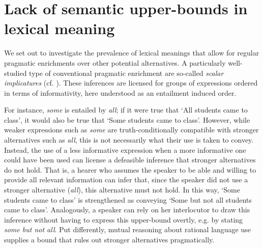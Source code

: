 \documentclass[a4paper]{article}
\newcommand{\tuple}[1]{\ensuremath{\left\langle #1 \right\rangle}}
\begin{document}



\section{Lack of semantic upper-bounds in lexical meaning}
We set out to investigate the prevalence of lexical meanings that allow for regular pragmatic enrichments over other potential alternatives. A particularly well-studied type of conventional pragmatic enrichment are so-called {\em scalar implicatures} (cf. \citealt{horn:1972,gazdar:1979}). These inferences are licensed for groups of expressions ordered in terms of informativity, here understood as an entailment induced order.

For instance, {\em some} is entailed by {\em all}; if it were true that `All students came to class', it would also be true that `Some students came to class'. However, while weaker expressions such as {\em some} are truth-conditionally compatible with stronger alternatives such as {\em all}, this is not necessarily what their use is taken to convey. Instead, the use of a less informative expression when a more informative one could have been used can license a defeasible inference that stronger alternatives do not hold. That is, a hearer who assumes the speaker to be able and willing to provide all relevant information can infer that, since the speaker did not use a stronger alternative ({\em all}), this alternative must not hold. In this way, `Some students came to class' is strengthened as conveying `Some but not all students came to class'. Analogously, a speaker can rely on her interlocutor to draw this inference without having to express this upper-bound overtly, e.g. by stating {\em some but not all}. Put differently, mutual reasoning about rational language use supplies a bound that rules out stronger alternatives pragmatically.
\end{document}

